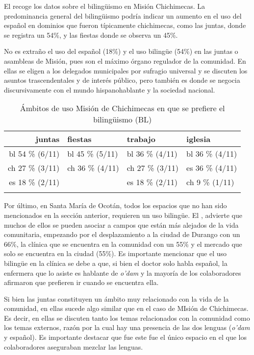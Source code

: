\documentclass[output=paper]{../langscibook}
\begin{document}
El  recoge los datos sobre el bilingüismo en Misión Chichimecas. La predominancia general del bilingüismo podría indicar un aumento en el uso del español en dominios que fueron típicamente chichimecas, como las juntas, donde se registra un 54\%, y las fiestas donde se observa un 45\%.

No es extraño el uso del español (18\%) y el uso bilingüe (54\%) en las juntas o asambleas de Misión, pues son el máximo órgano regulador de la comunidad. En ellas se eligen a los delegados municipales por sufragio universal y se discuten los asuntos trascendentales y de interés público, pero también es donde se negocia discursivamente con el mundo hispanohablante y la sociedad nacional.
  
\begin{table}
\caption{\label{tab:guerrero:13} Ámbitos de uso Misión de Chichimecas en que se prefiere el bilingüismo (BL)}
\begin{tabularx}{\textwidth}{rYYY}
\lsptoprule
{{juntas}} & {{fiestas}} & {{trabajo}} & {{iglesia}}\\
\midrule
{{bl} {54} {\%} {(6/11)}} & {{bl} {45} {\%} {(5/11)}} & {{bl} {36} {\%} {(4/11)}} & {{bl} {36} {\%} {(4/11)}}\\
{{ch} {27} {\%} {(3/11)}} & {{ch} {36} {\%} {(4/11)}} & {{ch} {27} {\%} {(3/11)}} & {{es} {36} {\%} {(4/11)}}\\
{{es} {18} {\%} {(2/11)}} &  & {{es} {18} {\%} {(2/11)}} & {{ch} {9} {\%} {(1/11)}}\\
\lspbottomrule
\end{tabularx}
\end{table}

Por último, en Santa María de Ocotán, todos los espacios que no han sido mencionados en la sección anterior, requieren un uso bilingüe. El , advierte que muchos de ellos se pueden asociar a campos que están más alejados de la vida comunitaria, empezando por el desplazamiento a la ciudad de Durango con un 66\%, la clínica que se encuentra en la comunidad con un 55\% y el mercado que solo se encuentra en la ciudad (55\%). Es importante mencionar que el uso bilingüe en la clínica se debe a que, si bien el doctor solo habla español, la enfermera que lo asiste es hablante de \textit{o'dam} y la mayoría de los colaboradores afirmaron que prefieren ir cuando se encuentra ella.

Si bien las juntas constituyen un ámbito muy relacionado con la vida de la comunidad, en ellas sucede algo similar que en el caso de MIsión de Chichimecas. Es decir, en ellas se discuten tanto los temas relacionados con la comunidad como los temas externos, razón por la cual hay una presencia de las dos lenguas (\textit{o'dam} y español). Es importante destacar que fue este fue el único espacio en el que los colaboradores aseguraban mezclar las lenguas.
\end{document}
